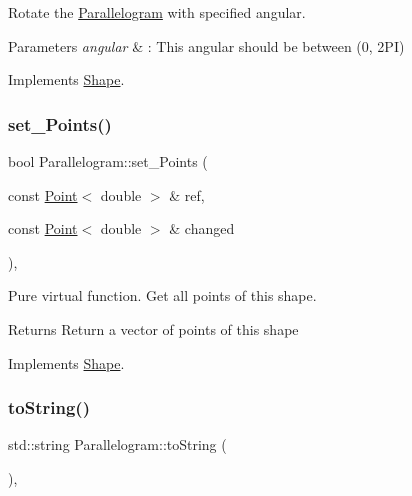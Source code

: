 Rotate the \hyperlink{classParallelogram}{Parallelogram} with specified angular. 


\begin{DoxyParams}{Parameters}
{\em angular} & \+: This angular should be between (0, 2\+PI) \\
\hline
\end{DoxyParams}


Implements \hyperlink{classShape_a2dea8616fd40f2d69fd208715921982a}{Shape}.

\mbox{\label{classParallelogram_ab74583703a60e4b798d7048aa684f44e}} 
\subsubsection{\texorpdfstring{set\+\_\+\+Points()}{set\_Points()}}
{\footnotesize\ttfamily bool Parallelogram\+::set\+\_\+\+Points (\begin{DoxyParamCaption}\item[{const \hyperlink{classPoint}{Point}$<$ double $>$ \&}]{ref,  }\item[{const \hyperlink{classPoint}{Point}$<$ double $>$ \&}]{changed }\end{DoxyParamCaption})\hspace{0.3cm}{\ttfamily [override]}, {\ttfamily [virtual]}}



Pure virtual function. Get all points of this shape. 

\begin{DoxyReturn}{Returns}
Return a vector of points of this shape 
\end{DoxyReturn}


Implements \hyperlink{classShape_a6eb0d80cccc44cb72b06c61d9780bc6b}{Shape}.

\mbox{\label{classParallelogram_a9caae0044f23d8a1e87b1a78d852c37f}} 
\subsubsection{\texorpdfstring{to\+String()}{toString()}}
{\footnotesize\ttfamily std\+::string Parallelogram\+::to\+String (\begin{DoxyParamCaption}{ }\end{DoxyParamCaption})\hspace{0.3cm}{\ttfamily [override]}, {\ttfamily [virtual]}}



